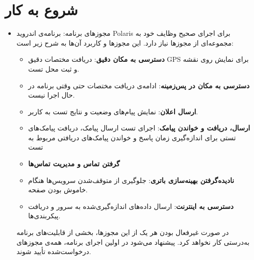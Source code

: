 \section{شروع به کار}
\begin{itemize}
	\item  مجوزهای برنامه: 
	برنامه‌ی اندروید Polaris برای اجرای صحیح وظایف خود به مجموعه‌ای از مجوزها نیاز دارد. این مجوزها و کاربرد آن‌ها به شرح زیر است:
	\begin{itemize}
		\item \textbf{دسترسی به مکان دقیق}: دریافت مختصات دقیق GPS برای نمایش روی نقشه و ثبت محل تست.
		\item \textbf{دسترسی به مکان در پس‌زمینه}: ادامه‌ی دریافت مختصات حتی وقتی برنامه در حال اجرا نیست.
		\item \textbf{ارسال اعلان}: نمایش پیام‌های وضعیت و نتایج تست به کاربر.
		\item \textbf{ارسال، دریافت و خواندن پیامک}: اجرای تست ارسال پیامک، دریافت پیامک‌های تستی برای اندازه‌گیری زمان پاسخ و خواندن پیامک‌های دریافتی مربوط به تست
		\item \textbf{گرفتن تماس و مدیریت تماس‌ها}
		\item \textbf{نادیده‌گرفتن بهینه‌سازی باتری}: جلوگیری از متوقف‌شدن سرویس‌ها هنگام خاموش بودن صفحه.
		\item \textbf{دسترسی به اینترنت}: ارسال داده‌های اندازه‌گیری‌شده به سرور و دریافت پیکربندی‌ها.
	\end{itemize}
	در صورت غیرفعال بودن هر یک از این مجوزها، بخشی از قابلیت‌های برنامه به‌درستی کار نخواهد کرد. پیشنهاد می‌شود در اولین اجرای برنامه، همه‌ی مجوزهای درخواست‌شده تأیید شوند.
	

\end{itemize}

